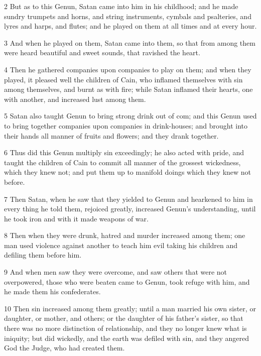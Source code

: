 \par 2 But as to this Genun, Satan came into him in his childhood; and he made sundry trumpets and horns, and string instruments, cymbals and psalteries, and lyres and harps, and flutes; and he played on them at all times and at every hour.

\par 3 And when he played on them, Satan came into them, so that from among them were heard beautiful and sweet sounds, that ravished the heart.

\par 4 Then he gathered companies upon companies to play on them; and when they played, it pleased well the children of Cain, who inflamed themselves with sin among themselves, and burnt as with fire; while Satan inflamed their hearts, one with another, and increased lust among them.

\par 5 Satan also taught Genun to bring strong drink out of com; and this Genun used to bring together companies upon companies in drink-houses; and brought into their hands all manner of fruits and flowers; and they drank together.

\par 6 Thus did this Genun multiply sin exceedingly; he also acted with pride, and taught the children of Cain to commit all manner of the grossest wickedness, which they knew not; and put them up to manifold doings which they knew not before.

\par 7 Then Satan, when he saw that they yielded to Genun and hearkened to him in every thing he told them, rejoiced greatly, increased Genun's understanding, until he took iron and with it made weapons of war.

\par 8 Then when they were drunk, hatred and murder increased among them; one man used violence against another to teach him evil taking his children and defiling them before him.

\par 9 And when men saw they were overcome, and saw others that were not overpowered, those who were beaten came to Genun, took refuge with him, and he made them his confederates.

\par 10 Then sin increased among them greatly; until a man married his own sister, or daughter, or mother, and others; or the daughter of his father's sister, so that there was no more distinction of relationship, and they no longer knew what is iniquity; but did wickedly, and the earth was defiled with sin, and they angered God the Judge, who had created them.


